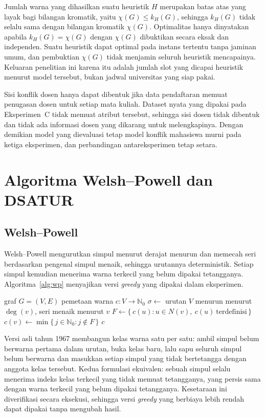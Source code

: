 \documentclass[conference,a4paper]{IEEEtran}
\begin{document}
Jumlah warna yang dihasilkan suatu heuristik $H$ merupakan batas atas yang
layak bagi bilangan kromatik, yaitu $\chi(G)\le k_H(G)$, sehingga $k_H(G)$
tidak selalu sama dengan bilangan kromatik $\chi(G)$. Optimalitas hanya
dinyatakan apabila $k_H(G)=\chi(G)$ dengan $\chi(G)$ dibuktikan secara eksak
dan independen. Suatu heuristik dapat optimal pada instans tertentu tanpa
jaminan umum, dan pembuktian $\chi(G)$ tidak menjamin seluruh heuristik
mencapainya. Keluaran penelitian ini karena itu adalah jumlah slot yang
dicapai heuristik menurut model tersebut, bukan jadwal universitas yang siap
pakai.

Sisi konflik dosen hanya dapat dibentuk jika data pendaftaran memuat penugasan
dosen untuk setiap mata kuliah. Dataset nyata yang dipakai pada Eksperimen~C
tidak memuat atribut tersebut, sehingga sisi dosen tidak dibentuk dan tidak ada
informasi dosen yang dikarang untuk melengkapinya. Dengan demikian model yang
dievaluasi tetap model konflik mahasiswa murni pada ketiga eksperimen, dan
perbandingan antareksperimen tetap setara.

\section{Algoritma Welsh--Powell dan DSATUR}
\label{sec:algo}

\subsection{Welsh--Powell}
Welsh--Powell mengurutkan simpul menurut derajat menurun dan memecah seri
berdasarkan pengenal simpul menaik, sehingga urutannya deterministik. Setiap
simpul kemudian menerima warna terkecil yang belum dipakai tetangganya.
Algoritma~\ref{alg:wp} menyajikan versi \emph{greedy} yang dipakai dalam
eksperimen.

\begin{algorithm}[!t]
\caption{Welsh--Powell (versi \emph{greedy})}
\label{alg:wp}
\begin{algorithmic}[1]
\Require graf $G=(V,E)$
\Ensure pemetaan warna $c:V\to\mathbb{N}_0$
\State $\sigma \gets$ urutan $V$ menurun menurut $\deg(v)$, seri menaik menurut $v$
  \State $F\gets\{\,c(u) : u\in N(v),\ c(u)\ \text{terdefinisi}\,\}$
  \State $c(v)\gets\min\{\,j\in\mathbb{N}_0 : j\notin F\,\}$
\EndFor
\State \Return $c$
\end{algorithmic}
\end{algorithm}

Versi asli tahun 1967 membangun kelas warna satu per satu: ambil simpul belum
berwarna pertama dalam urutan, buka kelas baru, lalu sapu seluruh simpul belum
berwarna dan masukkan setiap simpul yang tidak bertetangga dengan anggota kelas
tersebut. Kedua formulasi ekuivalen: sebuah simpul selalu menerima indeks kelas
terkecil yang tidak memuat tetangganya, yang persis sama dengan warna terkecil
yang belum dipakai tetangganya. Kesetaraan ini diverifikasi secara eksekusi,
sehingga versi \emph{greedy} yang berbiaya lebih rendah dapat dipakai tanpa
mengubah hasil.
\end{document}
